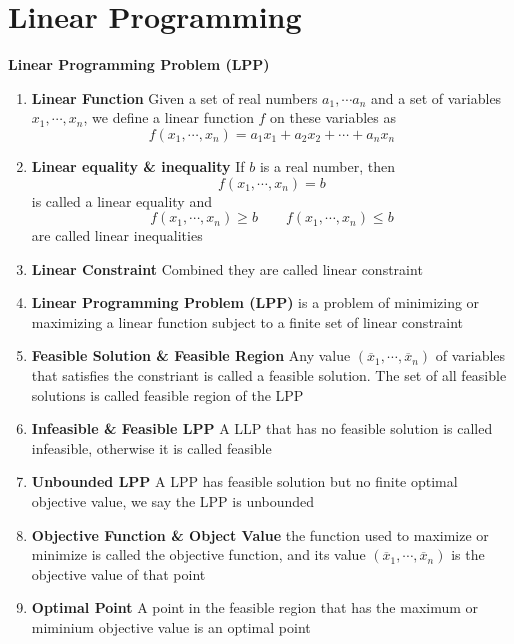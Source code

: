 \documentclass[11pt]{article}
\begin{document}
\section*{Linear Programming}


\begin{defn*}
    \textbf{Linear Programming Problem (LPP)}
    \begin{enumerate}
        \item \textbf{Linear Function} Given a set of real numbers $a_1,\cdots a_n$ and a set of variables $x_1,\cdots, x_n$, we define a linear function $f$ on these variables as 
        \[
            f(x_1,\cdots, x_n) = a_1 x_1 + a_2 x_2 + \cdots + a_n x_n
        \]
        \item \textbf{Linear equality \& inequality} If $b$ is a real number, then 
        \[
            f(x_1, \cdots, x_n) = b
        \] 
        is called a linear equality and 
        \[
            f(x_1, \cdots, x_n) \geq b \quad \quad f(x_1, \cdots, x_n) \leq b
        \]
        are called linear inequalities 
        \item \textbf{Linear Constraint} Combined they are called linear constraint 
        \item \textbf{Linear Programming Problem (LPP)} is a problem of minimizing or maximizing a linear function subject to a finite set of linear constraint
        \item \textbf{Feasible Solution \& Feasible Region} Any value $(\overline{x}_1,\cdots, \overline{x}_n)$ of variables that satisfies the constriant is called a feasible solution. The set of all feasible solutions is called feasible region of the LPP
        \item \textbf{Infeasible \& Feasible LPP} A LLP that has no feasible solution is called infeasible, otherwise it is called feasible
        \item \textbf{Unbounded LPP} A LPP has feasible solution but no finite optimal objective value, we say the LPP is unbounded
        \item \textbf{Objective Function \& Object Value} the function used to maximize or minimize is called the objective function, and its value $(\overline{x}_1,\cdots, \overline{x}_n)$ is the objective value of that point
        \item \textbf{Optimal Point} A point in the feasible region that has the maximum or miminium objective value is an optimal point
    \end{enumerate}
\end{defn*}
\end{document}

